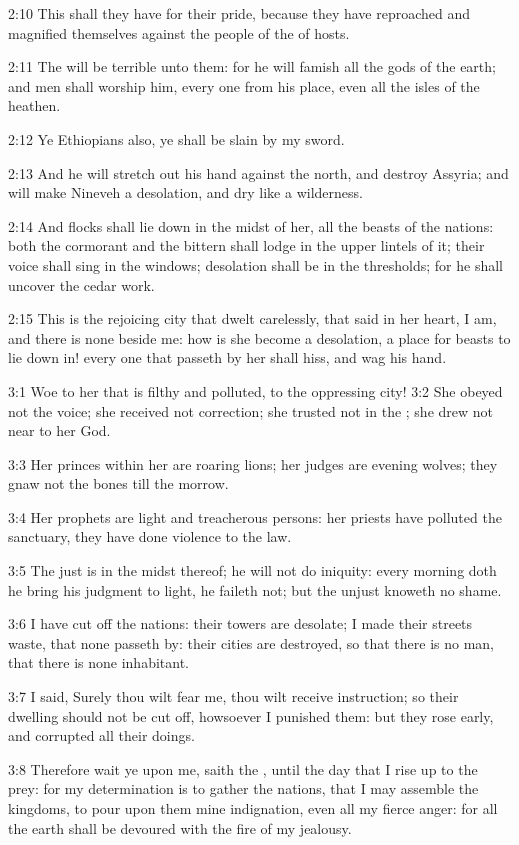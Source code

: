 2:10 This shall they have for their pride, because they have
reproached and magnified themselves against the people of the \LORD of
hosts.

2:11 The \LORD will be terrible unto them: for he will famish all the
gods of the earth; and men shall worship him, every one from his
place, even all the isles of the heathen.

2:12 Ye Ethiopians also, ye shall be slain by my sword.

2:13 And he will stretch out his hand against the north, and destroy
Assyria; and will make Nineveh a desolation, and dry like a
wilderness.

2:14 And flocks shall lie down in the midst of her, all the beasts of
the nations: both the cormorant and the bittern shall lodge in the
upper lintels of it; their voice shall sing in the windows; desolation
shall be in the thresholds; for he shall uncover the cedar work.

2:15 This is the rejoicing city that dwelt carelessly, that said in
her heart, I am, and there is none beside me: how is she become a
desolation, a place for beasts to lie down in! every one that passeth
by her shall hiss, and wag his hand.

3:1 Woe to her that is filthy and polluted, to the oppressing city!
3:2 She obeyed not the voice; she received not correction; she trusted
not in the \LORD; she drew not near to her God.

3:3 Her princes within her are roaring lions; her judges are evening
wolves; they gnaw not the bones till the morrow.

3:4 Her prophets are light and treacherous persons: her priests have
polluted the sanctuary, they have done violence to the law.

3:5 The just \LORD is in the midst thereof; he will not do iniquity:
every morning doth he bring his judgment to light, he faileth not; but
the unjust knoweth no shame.

3:6 I have cut off the nations: their towers are desolate; I made
their streets waste, that none passeth by: their cities are destroyed,
so that there is no man, that there is none inhabitant.

3:7 I said, Surely thou wilt fear me, thou wilt receive instruction;
so their dwelling should not be cut off, howsoever I punished them:
but they rose early, and corrupted all their doings.

3:8 Therefore wait ye upon me, saith the \LORD, until the day that I
rise up to the prey: for my determination is to gather the nations,
that I may assemble the kingdoms, to pour upon them mine indignation,
even all my fierce anger: for all the earth shall be devoured with the
fire of my jealousy.


